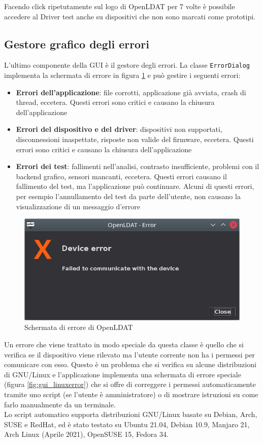 Facendo click ripetutamente sul logo di OpenLDAT per 7 volte è possibile accedere al Driver test anche su dispositivi che non sono marcati come prototipi.

\subsection{Gestore grafico degli errori}
L'ultimo componente della GUI è il gestore degli errori. La classe \texttt{ErrorDialog} implementa la schermata di errore in figura \ref{fig:gui_errordialog} e può gestire i seguenti errori:\begin{itemize}
	\item \textbf{Errori dell'applicazione}: file corrotti, applicazione già avviata, crash di thread, eccetera. Questi errori sono critici e causano la chiusura dell'applicazione
	\item \textbf{Errori del dispositivo e del driver}: dispositivi non supportati, disconnessioni inaspettate, risposte non valide del firmware, eccetera. Questi errori sono critici e causano la chiusura dell'applicazione
	\item \textbf{Errori dei test}: fallimenti nell'analisi, contrasto insufficiente, problemi con il backend grafico, sensori mancanti, eccetera. Questi errori causano il fallimento del test, ma l'applicazione può continuare. Alcuni di questi errori, per esempio l'annullamento del test da parte dell'utente, non causano la visualizzazione di un messaggio d'errore
\end{itemize}

\begin{figure}[H]
	\centering
	\includegraphics[width=.8\textwidth]{Applicazione_files/gui_errordialog.png}
	\caption{Schermata di errore di OpenLDAT}
	\label{fig:gui_errordialog}
\end{figure}

Un errore che viene trattato in modo speciale da questa classe è quello che si verifica se il dispositivo viene rilevato ma l'utente corrente non ha i permessi per comunicare con esso. Questo è un problema che si verifica su alcune distribuzioni di GNU/Linux e l'applicazione implementa una schermata di errore speciale (figura \ref{fig:gui_linuxerror}) che si offre di correggere i permessi automaticamente tramite uno script (se l'utente è amministratore) o di mostrare istruzioni su come farlo manualmente da un terminale.\\
Lo script automatico supporta distribuzioni GNU/Linux basate su Debian, Arch, SUSE e RedHat, ed è stato testato su Ubuntu 21.04, Debian 10.9, Manjaro 21, Arch Linux (Aprile 2021), OpenSUSE 15, Fedora 34.

